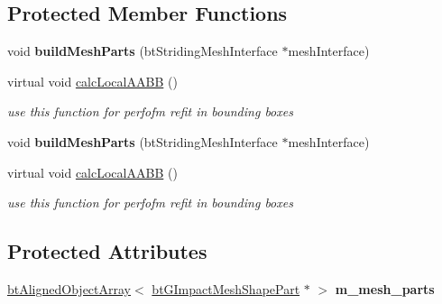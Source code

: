 \subsection*{Protected Member Functions}
\begin{DoxyCompactItemize}
\item 
\mbox{\label{classbtGImpactMeshShape_a97003b7f7d048c9fd8c8d281f0159311}} 
void {\bfseries build\+Mesh\+Parts} (bt\+Striding\+Mesh\+Interface $\ast$mesh\+Interface)
\item 
\mbox{\label{classbtGImpactMeshShape_aa9273d609f4872c7a4c05e9873edbda8}} 
virtual void \hyperlink{classbtGImpactMeshShape_aa9273d609f4872c7a4c05e9873edbda8}{calc\+Local\+A\+A\+BB} ()
\begin{DoxyCompactList}\small\item\em use this function for perfofm refit in bounding boxes \end{DoxyCompactList}\item 
\mbox{\label{classbtGImpactMeshShape_a97003b7f7d048c9fd8c8d281f0159311}} 
void {\bfseries build\+Mesh\+Parts} (bt\+Striding\+Mesh\+Interface $\ast$mesh\+Interface)
\item 
\mbox{\label{classbtGImpactMeshShape_aa9273d609f4872c7a4c05e9873edbda8}} 
virtual void \hyperlink{classbtGImpactMeshShape_aa9273d609f4872c7a4c05e9873edbda8}{calc\+Local\+A\+A\+BB} ()
\begin{DoxyCompactList}\small\item\em use this function for perfofm refit in bounding boxes \end{DoxyCompactList}\end{DoxyCompactItemize}
\subsection*{Protected Attributes}
\begin{DoxyCompactItemize}
\item 
\mbox{\label{classbtGImpactMeshShape_a2db5b3f57748b9dc912e13544c807552}} 
\hyperlink{classbtAlignedObjectArray}{bt\+Aligned\+Object\+Array}$<$ \hyperlink{classbtGImpactMeshShapePart}{bt\+G\+Impact\+Mesh\+Shape\+Part} $\ast$ $>$ {\bfseries m\+\_\+mesh\+\_\+parts}
\end{DoxyCompactItemize}


